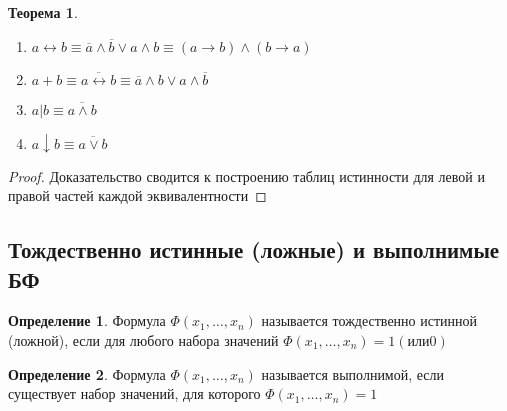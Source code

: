 \documentclass[a4paper]{article}
\newtheorem{theorem}{Теорема}[section]
\theoremstyle{definition}
\newtheorem*{definition}{Определение}
\theoremstyle{remark}
\begin{document}
\begin{theorem}
\begin{enumerate}
                \item $a \leftrightarrow b \equiv \overline{a} \wedge \overline{b} \vee a \wedge b \equiv (a \rightarrow b) \wedge (b \rightarrow a)$
                \item $a + b \equiv \overline{a \leftrightarrow b} \equiv \overline{a} \wedge b \vee a \wedge \overline{b}$
                \item $a | b \equiv \overline{a \wedge b}$
                \item $a \downarrow b \equiv \overline{a \vee b}$
            \end{enumerate}
	\end{theorem}
    \begin{proof}
        Доказательство сводится к построению таблиц истинности для левой и правой частей каждой эквивалентности
    \end{proof}
    \subsection{Тождественно истинные (ложные) и выполнимые БФ}
    \begin{definition}
        Формула $\Phi(x_1, \dots, x_n)$ называется тождественно истинной
        (ложной), если для любого набора значений $\Phi(x_1, \dots, x_n) = 1 (или 0)$
    \end{definition}
    \begin{definition}
        Формула $\Phi(x_1, \dots, x_n)$ называется выполнимой, если
        существует набор значений, для которого $\Phi(x_1, \dots, x_n) = 1$
    \end{definition}
\end{document}
